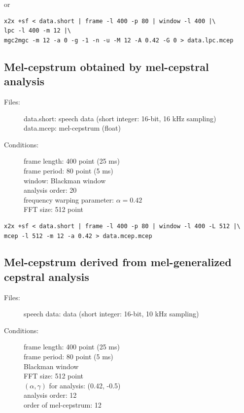 \documentclass[a4paper]{article}
\begin{document}
or

\begin{verbatim}
x2x +sf < data.short | frame -l 400 -p 80 | window -l 400 |\
lpc -l 400 -m 12 |\
mgc2mgc -m 12 -a 0 -g -1 -n -u -M 12 -A 0.42 -G 0 > data.lpc.mcep
\end{verbatim}

\subsection{Mel-cepstrum obtained by mel-cepstral analysis}

\begin{description}
\item[Files:]
  data.short: speech data (short integer: 16-bit, 16 kHz sampling)\\
  data.mcep: mel-cepstrum (float)
\item[Conditions:]
  frame length: 400 point (25 ms)\\
  frame period: 80 point (5 ms)\\
  window: Blackman window\\
  analysis order: 20 \\
  frequency warping parameter: $\alpha = 0.42$\\
  FFT size: 512 point
\end{description}

\begin{verbatim}
x2x +sf < data.short | frame -l 400 -p 80 | window -l 400 -L 512 |\
mcep -l 512 -m 12 -a 0.42 > data.mcep.mcep
\end{verbatim}

\subsection{Mel-cepstrum derived from mel-generalized cepstral analysis}

\begin{description}
\item[Files:]
   speech data: data (short integer: 16-bit, 10 kHz sampling)\\
\item[Conditions:]
  frame length: 400 point (25 ms)\\
  frame period: 80 point (5 ms)\\
  Blackman window\\
  FFT size: 512 point\\
  $(\alpha, \gamma)$ for analysis: (0.42, -0.5)\\
  analysis order: 12\\
  order of mel-cepstrum: 12
\end{description}
\end{document}
